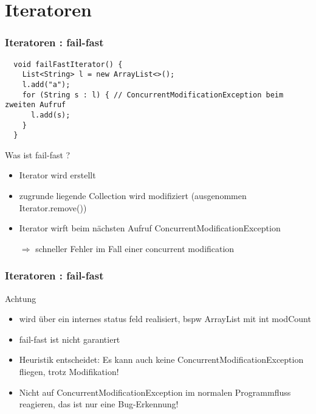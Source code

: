 \section{Iteratoren}

\begin{frame}[fragile]
  \frametitle{Iteratoren : fail-fast}

  \begin{lstlisting}
  void failFastIterator() {
    List<String> l = new ArrayList<>();
    l.add("a");
    for (String s : l) { // ConcurrentModificationException beim zweiten Aufruf
      l.add(s);
    }
  }
  \end{lstlisting}

  \begin{block}{Was ist fail-fast ?}
    \begin{itemize}[<+->]
      \item Iterator wird erstellt
      \item zugrunde liegende Collection wird modifiziert (ausgenommen Iterator.remove())
      \item Iterator wirft beim nächsten Aufruf ConcurrentModificationException
      \item[$\Rightarrow$] schneller Fehler im Fall einer concurrent modification
    \end{itemize}
  \end{block}

\end{frame}

\begin{frame}
  \frametitle{Iteratoren : fail-fast}

  \begin{block}{Achtung}
    \begin{itemize}[<+->]
      \item wird über ein internes status feld realisiert, bspw ArrayList mit int modCount
      \item fail-fast ist nicht garantiert
      \item Heuristik entscheidet: Es kann auch keine ConcurrentModificationException fliegen, trotz Modifikation!
      \item Nicht auf ConcurrentModificationException im normalen Programmfluss reagieren, das ist nur eine Bug-Erkennung!
    \end{itemize}
  \end{block}
  
\end{frame}